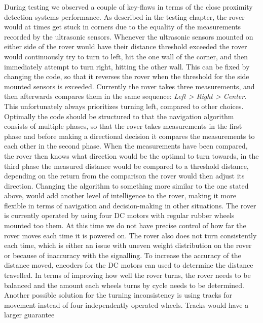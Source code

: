During testing we observed a couple of key-flaws in terms of the close proximity detection systems performance.
As described in the testing chapter, the rover would at times get stuck in corners due to the equality of the measurements recorded by the ultrasonic sensors. Whenever the ultrasonic sensors mounted on either side of the rover would have their distance threshold exceeded the rover would continuously try to turn to left, hit the one wall of the corner, and then immediately attempt to turn right, hitting the other wall. This can be fixed by changing the code, so that it reverses the rover when the threshold for the side mounted sensors is exceeded. Currently the rover takes three measurements, and then afterwards compares them in the same sequence: \textit{Left > Right > Center}. This unfortunately always prioritizes turning left, compared to other choices. Optimally the code should be structured to that the navigation algorithm consists of multiple phases, so that the rover takes measurements in the first phase and before making a directional decision it compares the measurements to each other in the second phase. When the measurements have been compared, the rover then knows what direction would be the optimal to turn towards, in the third phase the measured distance would be compared to a threshold distance, depending on the return from the comparison the rover would then adjust its direction.
Changing the algorithm to something more similar to the one stated above, would add another level of intelligence to the rover, making it more flexible in terms of navigation and decision-making in other situations.
The rover is currently operated by using four DC motors with regular rubber wheels mounted too them. At this time we do not have precise control of how far the rover moves each time it is powered on. The rover also does not turn consistently each time, which is either an issue with uneven weight distribution on the rover or because of inaccuracy with the signalling.
To increase the accuracy of the distance moved, encoders for the DC motors can used to determine the distance travelled.
 In terms of improving how well the rover turns, the rover needs to be balanced and the amount each wheels turns by cycle needs to be determined. Another possible solution for the turning inconsistency is using tracks for movement instead of four independently operated wheels. Tracks would have a larger guarantee %

